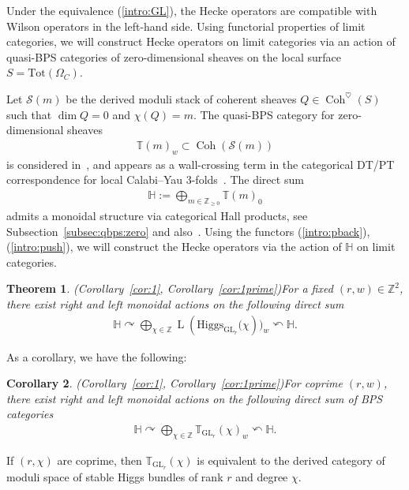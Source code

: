 \documentclass [11pt,oneside,a4paper,mathscr]{amsart}
\newtheorem{thm}{Theorem}[section]
\newtheorem{cor}[thm]{Corollary}
\theoremstyle{definition}
\renewcommand{\geq}{\geqslant}
\newcommand{\LL}{\operatorname{L}}
\newcommand{\Coh}{\operatorname{Coh}}
\newcommand{\GL}{\operatorname{GL}}
\newcommand{\Hig}{\mathrm{Higgs}}
\begin{document}
Under the equivalence (\ref{intro:GL}), the Hecke operators are compatible with Wilson operators 
in the left-hand side. 
Using functorial properties of limit categories, we will construct Hecke operators on limit categories
via an action of 
quasi-BPS categories of zero-dimensional sheaves on the local surface $S=\mathrm{Tot}(\Omega_C)$. 

Let $\mathcal{S}(m)$ be the derived moduli stack of coherent sheaves $Q\in \Coh^{\heartsuit}(S)$
such that $\dim Q=0$ and $\chi(Q)=m$. The quasi-BPS category for zero-dimensional sheaves
\begin{align*}
    \mathbb{T}(m)_{w} \subset \Coh(\mathcal{S}(m))
\end{align*}
is considered in~\cite{P2, PT0, PT2}, and appears as a wall-crossing term in the 
categorical DT/PT correspondence for local Calabi–Yau 3-folds~\cite{PT2}. 
The direct sum
\begin{align*}
    \mathbb{H}:=\bigoplus_{m\in \mathbb{Z}_{\geq 0}}\mathbb{T}(m)_0
\end{align*}
admits a monoidal structure via categorical Hall products, see
Subsection~\ref{subsec:qbps:zero} and also~\cite{P2, PT0, PT2}.
Using the functors (\ref{intro:pback}), (\ref{intro:push}), we will 
construct the Hecke operators via the action of $\mathbb{H}$ on 
limit categories. 
\begin{thm}\emph{(Corollary~\ref{cor:1}, Corollary~\ref{cor:1prime})}\label{intro:cor2}
For a fixed $(r, w)\in \mathbb{Z}^2$, there exist right and left monoidal actions on 
     the following direct sum 
    \begin{align*}
   \mathbb{H} \curvearrowright     \bigoplus_{\chi \in \mathbb{Z}}\LL(\Hig_{\mathrm{GL}_r}
   \mathbb(\chi))_w \curvearrowleft\mathbb{H}.
    \end{align*}
\end{thm}
As a corollary, we have the following:
\begin{cor}\emph{(Corollary~\ref{cor:1}, Corollary~\ref{cor:1prime})}\label{intro:cor3}
For coprime $(r, w)$, there exist right and left monoidal actions on 
     the following direct sum of BPS categories 
    \begin{align*}
 \mathbb{H} \curvearrowright     \bigoplus_{\chi \in \mathbb{Z}}
 \mathbb{T}_{\GL_r}(\chi)_w \curvearrowleft\mathbb{H}.
    \end{align*} 
\end{cor}
If $(r, \chi)$ are coprime, then $\mathbb{T}_{\GL_r}(\chi)$ is equivalent to the derived 
category of moduli space of stable Higgs bundles of rank $r$ and degree $\chi$. 
\end{document}
